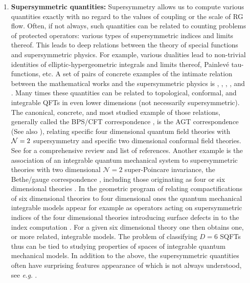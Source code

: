 \documentclass[12pt]{article}
\newcommand\CalN{\mathcal{N}}
\begin{document}
\begin{enumerate}
 \item  {\bf Supersymmetric quantities:} Supersymmetry allows us to compute various quantities exactly with no regard to the values of coupling or the scale of RG flow. Often, if not always, such quantities can be related to counting problems of protected operators: various types of supersymmetric indices and limits thereof. This leads to deep relations between the theory of special functions and supersymmetric physics. 
For example, various dualities lead to non-trivial identities of elliptic-hypergeometric integrals and limits thereof, Painlev{\'e} tau-functions, etc. A set of pairs of concrete examples of the intimate relation between the mathematical works and the supersymmetric physics is \cite{rains,Seiberg:1994pq}, \cite{Ruijsenaars:2020shk,Razamat:2018zel},
\cite{2014arXiv1408.0305R,Pasquetti:2019hxf}, \cite{debultthesis,Benini:2011mf}, and   \cite{MR2787288,Gadde:2009kb}. 
Many times these quantities can be related to topological, conformal, and integrable QFTs in even lower dimensions (not necessarily supersymmetric). The canonical, concrete, and most studied example of those relations, generally called the BPS/CFT correspondence \cite{NN2004:BPSCFT0, NN2004:BPSCFT1}, is the AGT correspondence \cite{Alday:2009aq}  (See also \cite{Alday:2009fs,Drukker:2009tz,Kozcaz:2010af,Dimofte:2010tz}), relating specific four dimensional quantum field theories with ${\cal N}=2$ supersymmetry and specific two dimensional conformal field theories. See \cite{LeFloch:2020uop} for a comprehensive review and list of references. Another example is the association of an integrable quantum mechanical system to supersymmetric theories with two dimensional ${\CalN}=2$ super-Poincare invariance, the Bethe/gauge correspondence \cite{Nekrasov:2009uh}, including those originating as four or six dimensional theories \cite{Gadde:2009kb,Gaiotto:2012xa,Gaiotto:2015usa,Maruyoshi:2016caf,Yagi:2017hmj,Nazzal:2018brc,Nazzal:2021tiu,Razamat:2018zel,Ruijsenaars:2020shk,Chen:2020jla,Chen:2021ivd,Chen:2021rek}. In the geometric program of relating compactifications of six dimensional theories to four dimensional ones the quantum mechanical integrable models appear for example as operators acting on supersymmetric indices \cite{Kinney:2005ej,Romelsberger:2005eg,Dolan:2008qi} of the four dimensional theories introducing surface defects in to the index computation \cite{Gaiotto:2012xa}. For a given six dimensional theory one then obtains one, or more \cite{Nazzal:2021tiu} related, integrable models. The problem of classifying $D=6$ SQFTs  thus can be tied to studying properties of spaces of integrable quantum mechanical models. In addition to the above, the  supersymmetric quantities often have surprising features appearance of which is not always understood, see {\it e.g.} \cite{Buican:2019kba}.


\end{enumerate}
\end{document}
